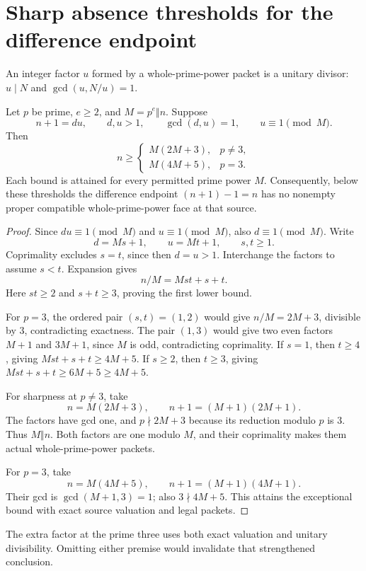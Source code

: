 \section{Sharp absence thresholds for the difference endpoint}
An integer factor \(u\) formed by a whole-prime-power packet is a unitary divisor: \(u\mid N\) and \(\gcd(u,N/u)=1\).
\begin{theorem}\label{signed:thm:threshold}
Let \(p\) be prime, \(e\ge2\), and \(M=p^e\Vert n\). Suppose
\[
 n+1=du,\qquad d,u>1,\qquad \gcd(d,u)=1,\qquad u\equiv1\pmod M.
\]
Then
\begin{equation}\label{signed:eq:threshold}
 n\ge
 \begin{cases}
 M(2M+3),&p\ne3,\\
 M(4M+5),&p=3.
 \end{cases}
\end{equation}
Each bound is attained for every permitted prime power \(M\). Consequently, below these thresholds the difference endpoint \((n+1)-1=n\) has no nonempty proper compatible whole-prime-power face at that source.
\end{theorem}
\begin{proof}
Since \(du\equiv1\pmod M\) and \(u\equiv1\pmod M\), also \(d\equiv1\pmod M\). Write
\[
 d=Ms+1,\qquad u=Mt+1,\qquad s,t\ge1.
\]
Coprimality excludes \(s=t\), since then \(d=u>1\). Interchange the factors to assume \(s<t\). Expansion gives
\begin{equation}\label{signed:eq:bilinear}
 n/M=Mst+s+t.
\end{equation}
Here \(st\ge2\) and \(s+t\ge3\), proving the first lower bound.

For \(p=3\), the ordered pair \((s,t)=(1,2)\) would give \(n/M=2M+3\), divisible by \(3\), contradicting exactness. The pair \((1,3)\) would give two even factors \(M+1\) and \(3M+1\), since \(M\) is odd, contradicting coprimality. If \(s=1\), then \(t\ge4\), giving \(Mst+s+t\ge4M+5\). If \(s\ge2\), then \(t\ge3\), giving \(Mst+s+t\ge6M+5\ge4M+5\).

For sharpness at \(p\ne3\), take
\[
 n=M(2M+3),\qquad n+1=(M+1)(2M+1).
\]
The factors have gcd one, and \(p\nmid2M+3\) because its reduction modulo \(p\) is \(3\). Thus \(M\Vert n\). Both factors are one modulo \(M\), and their coprimality makes them actual whole-prime-power packets.

For \(p=3\), take
\[
 n=M(4M+5),\qquad n+1=(M+1)(4M+1).
\]
Their gcd is \(\gcd(M+1,3)=1\); also \(3\nmid4M+5\). This attains the exceptional bound with exact source valuation and legal packets.
\end{proof}
The extra factor at the prime three uses both exact valuation and unitary divisibility. Omitting either premise would invalidate that strengthened conclusion.

